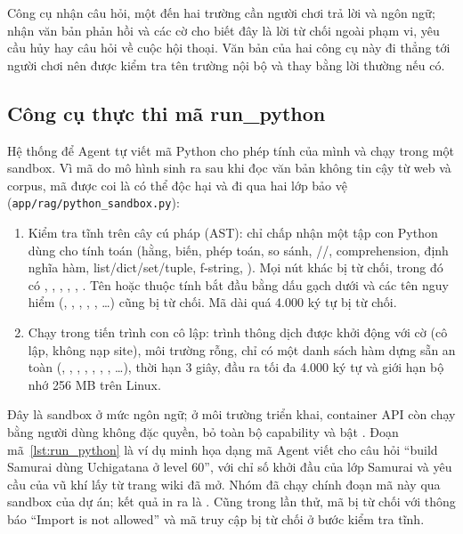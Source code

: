 Công cụ  nhận câu hỏi, một đến hai trường cần người chơi trả lời và ngôn ngữ;  nhận văn bản phản hồi và các cờ cho biết đây là lời từ chối ngoài phạm vi, yêu cầu hủy hay câu hỏi về cuộc hội thoại. Văn bản của hai công cụ này đi thẳng tới người chơi nên được kiểm tra tên trường nội bộ và thay bằng lời thường nếu có.

\subsection{Công cụ thực thi mã run\_python}
\label{sec:impl_python}

Hệ thống để Agent tự viết mã Python cho phép tính của mình và chạy trong một sandbox. Vì mã do mô hình sinh ra sau khi đọc văn bản không tin cậy từ web và corpus, mã được coi là có thể độc hại và đi qua hai lớp bảo vệ (\nolinkurl{app/rag/python_sandbox.py}):
\begin{enumerate}
    \item Kiểm tra tĩnh trên cây cú pháp (AST): chỉ chấp nhận một tập con Python dùng cho tính toán (hằng, biến, phép toán, so sánh, //, comprehension, định nghĩa hàm, list/dict/set/tuple, f-string, ). Mọi nút khác bị từ chối, trong đó có , , , , , . Tên hoặc thuộc tính bắt đầu bằng dấu gạch dưới và các tên nguy hiểm (, , , , , \ldots) cũng bị từ chối. Mã dài quá 4.000 ký tự bị từ chối.
    \item Chạy trong tiến trình con cô lập: trình thông dịch được khởi động với cờ  (cô lập, không nạp site), môi trường rỗng, chỉ có một danh sách hàm dựng sẵn an toàn (, , , , , , , \ldots), thời hạn 3 giây, đầu ra tối đa 4.000 ký tự và giới hạn bộ nhớ 256 MB trên Linux.
\end{enumerate}
Đây là sandbox ở mức ngôn ngữ; ở môi trường triển khai, container API còn chạy bằng người dùng không đặc quyền, bỏ toàn bộ capability và bật . Đoạn mã~\ref{lst:run_python} là ví dụ minh họa dạng mã Agent viết cho câu hỏi ``build Samurai dùng Uchigatana ở level 60'', với chỉ số khởi đầu của lớp Samurai và yêu cầu của vũ khí lấy từ trang wiki đã mở. Nhóm đã chạy chính đoạn mã này qua sandbox của dự án; kết quả in ra là . Cũng trong lần thử, mã  bị từ chối với thông báo ``Import is not allowed'' và mã truy cập  bị từ chối ở bước kiểm tra tĩnh.

